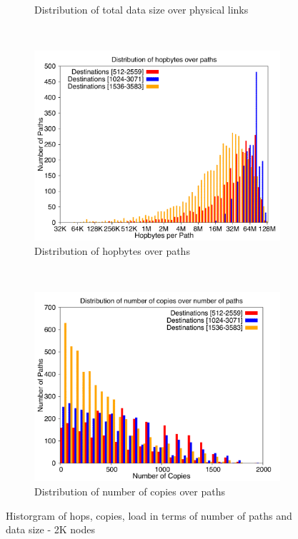 \begin{figure}[!htbp]
\begin{subfigure}[b]{0.49\textwidth}
                \caption{Distribution of total data size over physical links}
                \label{fig:incrdist_4k_loaddata}
        \end{subfigure}
        ~ %
        \begin{subfigure}[b]{0.49\textwidth}
                \includegraphics[width=\textwidth]{report_figures/incrdist/4k/hopbyte_histo.pdf}
                \caption{Distribution of hopbytes over paths}
                \label{fig:incrdist_4k_hopbyte}
        \end{subfigure}
        ~ %
        \begin{subfigure}[b]{0.49\textwidth}
                \includegraphics[width=\textwidth]{report_figures/incrdist/4k/hopcopy_histo.pdf}
                \caption{Distribution of number of copies over paths}
                \label{fig:incrdist_4k_hopcopy}
        \end{subfigure}
        \caption{Historgram of hops, copies, load in terms of number of paths and data size - 2K nodes}
        \label{fig:incrdist_4k_histo}
\end{figure}
